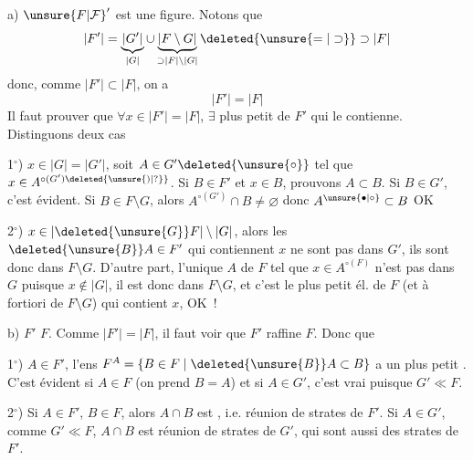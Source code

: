 a) ${\unsure{F|\mathcal F}}'$ est une figure.  Notons que 
\[
 |F'|=\underbrace{|G'|}_{|G|}\cup\underbrace{|F\setminus G|}_{\supset |F|\setminus |G|}\deleted{\unsure{=|\supset}}\supset |F|
\]
donc, comme $|F'|\subset |F|$, on a
\[
 |F'|=|F|
\]
Il faut prouver que $\forall x\in |F'|=|F|$, $\exists$ plus petit  de $F'$ qui le contienne. Distinguons deux cas

1$^\circ$) $x\in |G|=|G'|$, soit $A\in G'\deleted{\unsure{\circ}}$ tel que $x\in A^{\circ(G')\deleted{\unsure{)|?}}}$. Si $B\in F'$ et  $x\in B$, prouvons $A\subset B$. Si $B\in G'$, c'est évident. Si $B\in F\setminus G$, alors  $A^{\circ(G')}\cap B\ne\varnothing$ donc $A^{\unsure{\bullet|\circ}}\subset B$ OK

2$^\circ$) $x\in |\deleted{\unsure{G}}F|\setminus |G|$, alors les $\deleted{\unsure{B}}A\in F'$ qui contiennent $x$ ne sont pas dans $G'$, ils sont donc dans $F\setminus G$. D'autre part, l'unique  $A$ de $F$ tel que $x\in A^{\circ(F)}$ n'est pas dans $G$ puisque $x\notin |G|$, il est donc dans $F\setminus G$, et  c'est le plus petit él. de $F$ (et à fortiori de $F\setminus G$) qui contient $x$, OK~!

b) $F'$  $F$. Comme $|F'|=|F|$, il faut voir  que $F'$ raffine $F$. Donc  que

1$^\circ$)  $A\in F'$, l'ens $F^A=\{B\in F\mid \deleted{\unsure{B}}A\subset B\}$ a un plus petit . C'est évident si $A\in F$  (on prend $B=A$) et si $A\in G'$, c'est vrai puisque $G'\ll F$.

2$^\circ$) Si $A\in F'$, $B\in F$, alors $A\cap B$ est , i.e. réunion de strates de $F'$. Si $A\in G'$, comme $G'\ll F$, $A\cap B$ est réunion de strates de $G'$, qui sont aussi des strates de $F'$.
